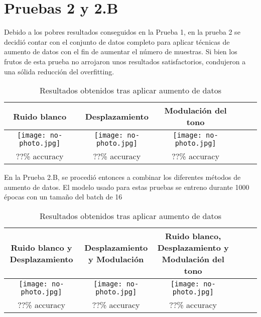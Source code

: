 \documentclass[11pt,a4paper,spanish]{book}
\begin{document}
	\section{Pruebas 2 y 2.B}
	Debido a los pobres resultados conseguidos en la Prueba 1, en la prueba 2 se decidió contar con el conjunto de datos completo para aplicar técnicas de aumento de datos con el fin de aumentar el número de muestras. Si bien los frutos de esta prueba no arrojaron unos resultados satisfactorios, condujeron a una sólida reducción del overfitting.
	
	\begin{table}[H]
		\centering
		\begin{center}
			\begin{tabular}{| c | c | c | c | c | c |}
				\hline
				Ruido blanco & Desplazamiento & Modulación del tono \\ 
				\hline
				\texttt{[image: no-photo.jpg]} & \texttt{[image: no-photo.jpg]} & \texttt{[image: no-photo.jpg]}\\
				\hline
				??\% accuracy  & ??\%  accuracy & ??\% accuracy \\
				\hline	
			\end{tabular}
			\caption{Resultados obtenidos tras aplicar aumento de datos}
		\end{center}
	\end{table}
	En la Prueba 2.B, se procedió entonces a combinar los diferentes métodos de aumento de datos. El modelo usado para estas pruebas se entreno durante 1000 épocas con un tamaño del batch de 16
	
	\begin{table}[H]
		\centering
		\begin{center}
			\begin{tabular}{| c | c | c | c | c | c |}
				\hline
				Ruido blanco y Desplazamiento& Desplazamiento y Modulación & Ruido blanco, Desplazamiento y Modulación del tono \\ 
				\hline
				\texttt{[image: no-photo.jpg]} & \texttt{[image: no-photo.jpg]} & \texttt{[image: no-photo.jpg]}\\
				\hline
				??\% accuracy & ??\%  accuracy & ??\% accuracy \\
				\hline	
			\end{tabular}
			\caption{Resultados obtenidos tras aplicar aumento de datos}
		\end{center}
	\end{table}
	
\end{document}

